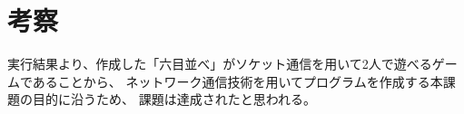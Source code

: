 \documentclass[a4j, titlepage, 10pt]{jsarticle}
\begin{document}
\section{考察}

実行結果より、作成した「六目並べ」がソケット通信を用いて2人で遊べるゲームであることから、
ネットワーク通信技術を用いてプログラムを作成する本課題の目的に沿うため、
課題は達成されたと思われる。
\end{document}
